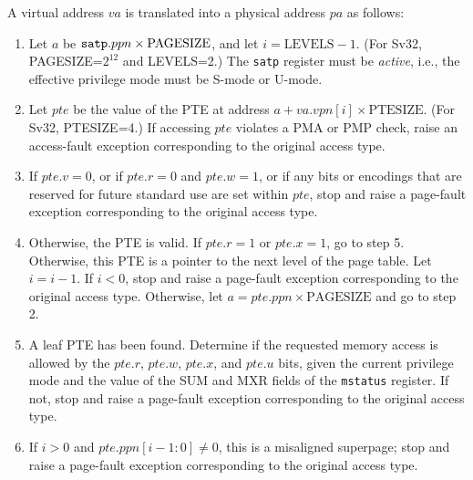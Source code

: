 A virtual address $va$ is translated into a physical address $pa$ as
follows:

\begin{enumerate}

\item Let $a$ be ${\tt satp}.ppn \times \textrm{PAGESIZE}$, and let $i=\textrm{LEVELS} - 1$. (For Sv32, PAGESIZE=$2^{12}$ and LEVELS=2.)
  The {\tt satp} register must be {\em active}, i.e., the effective privilege
  mode must be S-mode or U-mode.

\item Let $pte$ be the value of the PTE at address
  $a+va.vpn[i]\times \textrm{PTESIZE}$. (For Sv32, PTESIZE=4.)
  If accessing $pte$ violates a PMA or PMP check, raise an
  access-fault exception corresponding to the original access type.

\item If $pte.v=0$, or if $pte.r=0$ and $pte.w=1$, or if any bits or encodings
  that are reserved for future standard use are set within $pte$, stop and
  raise a page-fault exception corresponding to the original access type.

\item Otherwise, the PTE is valid.
  If $pte.r=1$ or $pte.x=1$, go to step 5.
  Otherwise, this PTE is a pointer to the next level of the page table.  Let
  $i=i-1$.  If $i<0$, stop and raise a page-fault exception
  corresponding to the original access type.  Otherwise, let
  $a=pte.ppn \times \textrm{PAGESIZE}$ and go to step 2.

\item A leaf PTE has been found.  Determine if the requested memory access is
  allowed by the $pte.r$, $pte.w$, $pte.x$, and $pte.u$ bits, given the
  current privilege mode and the value of the SUM and MXR fields of
  the {\tt mstatus} register.  If not, stop and raise a page-fault
  exception corresponding to the original access type.

\item If $i>0$ and $pte.ppn[i-1:0]\neq 0$, this is a misaligned superpage;
  stop and raise a page-fault exception corresponding to the original access type.


\end{enumerate}

